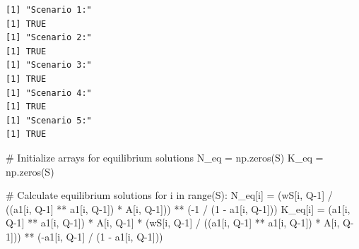 \documentclass[
  letterpaper,
  DIV=11,
  numbers=noendperiod]{scrreprt}
\newenvironment{Shaded}{\begin{snugshade}}{\end{snugshade}}
\newcommand{\BuiltInTok}[1]{\textcolor[rgb]{0.00,0.23,0.31}{#1}}
\newcommand{\CommentTok}[1]{\textcolor[rgb]{0.37,0.37,0.37}{#1}}
\newcommand{\ControlFlowTok}[1]{\textcolor[rgb]{0.00,0.23,0.31}{#1}}
\newcommand{\DecValTok}[1]{\textcolor[rgb]{0.68,0.00,0.00}{#1}}
\newcommand{\KeywordTok}[1]{\textcolor[rgb]{0.00,0.23,0.31}{#1}}
\newcommand{\NormalTok}[1]{\textcolor[rgb]{0.00,0.23,0.31}{#1}}
\newcommand{\OperatorTok}[1]{\textcolor[rgb]{0.37,0.37,0.37}{#1}}
\begin{document}
\begin{verbatim}
[1] "Scenario 1:"
[1] TRUE
[1] "Scenario 2:"
[1] TRUE
[1] "Scenario 3:"
[1] TRUE
[1] "Scenario 4:"
[1] TRUE
[1] "Scenario 5:"
[1] TRUE
\end{verbatim}

\begin{tcolorbox}[enhanced jigsaw, titlerule=0mm, breakable, bottomrule=.15mm, toprule=.15mm, colbacktitle=quarto-callout-note-color!10!white, rightrule=.15mm, toptitle=1mm, opacityback=0, left=2mm, coltitle=black, title=\textcolor{quarto-callout-note-color}{\faInfo}\hspace{0.5em}{Python code}, colframe=quarto-callout-note-color-frame, opacitybacktitle=0.6, leftrule=.75mm, bottomtitle=1mm, arc=.35mm, colback=white]

\begin{Shaded}
\begin{Highlighting}[]
\CommentTok{\# Initialize arrays for equilibrium solutions}
\NormalTok{N\_eq }\OperatorTok{=}\NormalTok{ np.zeros(S)}
\NormalTok{K\_eq }\OperatorTok{=}\NormalTok{ np.zeros(S)}

\CommentTok{\# Calculate equilibrium solutions}
\ControlFlowTok{for}\NormalTok{ i }\KeywordTok{in} \BuiltInTok{range}\NormalTok{(S):}
\NormalTok{    N\_eq[i] }\OperatorTok{=}\NormalTok{ (wS[i, Q}\OperatorTok{{-}}\DecValTok{1}\NormalTok{] }\OperatorTok{/}\NormalTok{ ((a1[i, Q}\OperatorTok{{-}}\DecValTok{1}\NormalTok{] }\OperatorTok{**}\NormalTok{ a1[i, Q}\OperatorTok{{-}}\DecValTok{1}\NormalTok{]) }\OperatorTok{*}\NormalTok{ A[i, Q}\OperatorTok{{-}}\DecValTok{1}\NormalTok{])) }\OperatorTok{**}\NormalTok{ (}\OperatorTok{{-}}\DecValTok{1} \OperatorTok{/}\NormalTok{ (}\DecValTok{1} \OperatorTok{{-}}\NormalTok{ a1[i, Q}\OperatorTok{{-}}\DecValTok{1}\NormalTok{]))}
\NormalTok{    K\_eq[i] }\OperatorTok{=}\NormalTok{ (a1[i, Q}\OperatorTok{{-}}\DecValTok{1}\NormalTok{] }\OperatorTok{**}\NormalTok{ a1[i, Q}\OperatorTok{{-}}\DecValTok{1}\NormalTok{]) }\OperatorTok{*}\NormalTok{ A[i, Q}\OperatorTok{{-}}\DecValTok{1}\NormalTok{] }\OperatorTok{*}\NormalTok{ (wS[i, Q}\OperatorTok{{-}}\DecValTok{1}\NormalTok{] }\OperatorTok{/}\NormalTok{ ((a1[i, Q}\OperatorTok{{-}}\DecValTok{1}\NormalTok{] }\OperatorTok{**}\NormalTok{ a1[i, Q}\OperatorTok{{-}}\DecValTok{1}\NormalTok{]) }\OperatorTok{*}\NormalTok{ A[i, Q}\OperatorTok{{-}}\DecValTok{1}\NormalTok{])) }\OperatorTok{**}\NormalTok{ (}\OperatorTok{{-}}\NormalTok{a1[i, Q}\OperatorTok{{-}}\DecValTok{1}\NormalTok{] }\OperatorTok{/}\NormalTok{ (}\DecValTok{1} \OperatorTok{{-}}\NormalTok{ a1[i, Q}\OperatorTok{{-}}\DecValTok{1}\NormalTok{]))}


\end{Highlighting}
\end{Shaded}
\end{tcolorbox}
\end{document}
